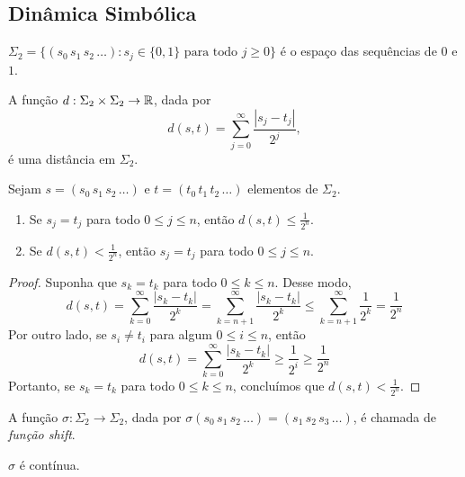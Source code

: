 \subsection{Dinâmica Simbólica}

\begin{definition}
$\Sigma_2 = \{(s_0\, s_1\, s_2\, \dots) : s_j \in \{ 0, 1 \}\text{ para todo } j \geq 0\}$ é o espaço das sequências de $0$ e $1$.
\end{definition}

\begin{proposition}
A função $d: \Sigma_2 \times \Sigma_2 \to \mathbb{R}$, dada por
$$d(s, t) = \sum_{j=0}^{\infty} \frac{|s_j - t_j|}{2^j},$$
é uma distância em $\Sigma_2$.
\end{proposition}

\begin{proposition} \label{proposicao dinamicasimbolica 1}
Sejam $s = (s_0\, s_1\, s_2\, \dots)$ e $t = (t_0\, t_1\, t_2\, \dots)$ elementos de $\Sigma_2$.
\begin{enumerate}
\item Se $s_j = t_j$ para todo $0 \leq j \leq n$, então $d(s, t) \leq \frac{1}{2^n}$.
\item Se $d(s, t) < \frac{1}{2^n}$, então $s_j = t_j$ para todo $0 \leq j \leq n$.
\end{enumerate}
\end{proposition}

\begin{proof}
Suponha que $s_k = t_ k$ para todo $0 \leq k \leq n$. Desse modo, $$d(s, t) = \sum_{k=0}^{\infty} \frac{|s_k - t_k|}{2^k} = \sum_{k=n+1}^{\infty} \frac{|s_k - t_k|}{2^k} \leq \sum_{k=n+1}^{\infty} \frac{1}{2^k} = \frac{1}{2^n}$$
Por outro lado, se $s_i \neq t_i$ para algum $0 \leq i \leq n$, então $$d(s, t) = \sum_{k=0}^{\infty} \frac{|s_k - t_k|}{2^k} \geq \frac{1}{2^i} \geq \frac{1}{2^n}$$ Portanto, se $s_k = t_k$ para todo $0 \leq k \leq n$, concluímos que $d(s, t) < \frac{1}{2^n}$.
\end{proof}

\begin{definition}
A função $\sigma: \Sigma_2 \to \Sigma_2$, dada por $\sigma(s_0\, s_1\, s_2\, \dots) = (s_1\, s_2\, s_3\, \dots)$, é chamada de \textit{função shift}.
\end{definition}

\begin{proposition}
$\sigma$ é contínua.
\end{proposition}

